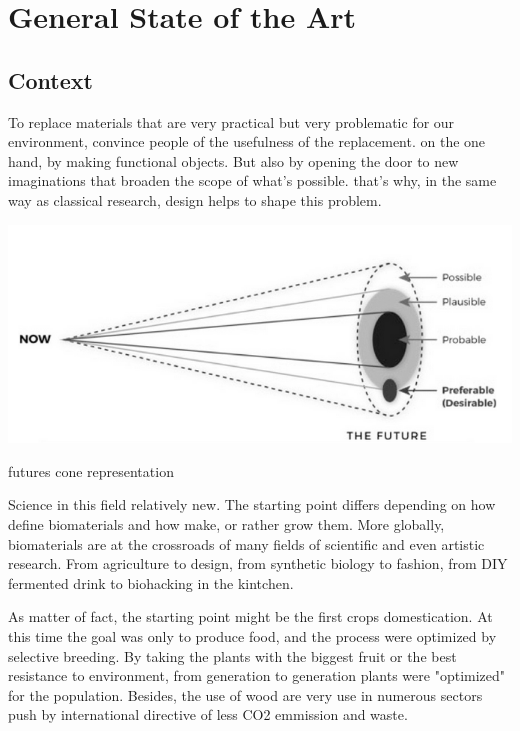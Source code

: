 \chapter{General State of the Art}


\section{Context}

To replace materials that are very practical but very problematic for our environment, convince people of the usefulness of the replacement. on the one hand, by making functional objects. But also by opening the door to new imaginations that broaden the scope of what's possible. that's why, in the same way as classical research, design helps to shape this problem. 
\begin{marginfigure}[-5cm] %
    \centering
    \includegraphics[width=\linewidth]{images/futures_cone.png}
    \caption{futures cone representation}
    \label{fig:plastics}
\end{marginfigure}
Science in this field relatively new. The starting point differs depending on how define biomaterials and how make, or rather grow them. 
More globally, biomaterials are at the crossroads of many fields of scientific and even artistic research. From agriculture to design, from synthetic biology to fashion, from DIY fermented drink to biohacking in the kintchen\cite{CiteTheOdin}.

As matter of fact, the starting point might be the first crops domestication. At this time the goal was only to produce food, and the process were optimized by selective breeding. By taking the plants with the biggest fruit or the best resistance to environment, from generation to generation plants were "optimized" for the population.
Besides, the use of wood are very use in numerous sectors\cite{ramage2017wood} push by international directive of less CO2 emmission and waste. 
  
